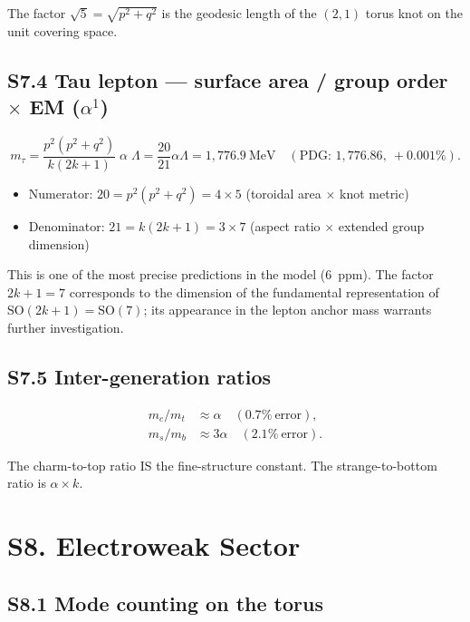 \documentclass[11pt,a4paper]{article}
\begin{document}
The factor $\sqrt{5} = \sqrt{p^2+q^2}$ is the geodesic length of the $(2,1)$ torus knot on the unit covering space.

\subsection{S7.4 Tau lepton --- surface area / group order \texorpdfstring{$\times$}{x} EM \texorpdfstring{($\alpha^1$)}{(alpha1)}}

\begin{equation}
  m_\tau = \frac{p^2(p^2+q^2)}{k(2k+1)}\;\alpha\;\Lambda = \frac{20}{21}\alpha\Lambda = 1{,}776.9~\text{MeV} \quad (\text{PDG: } 1{,}776.86,\ +0.001\%).
\end{equation}

\begin{itemize}
  \item Numerator: $20 = p^2(p^2+q^2) = 4\times 5$ (toroidal area $\times$ knot metric)
  \item Denominator: $21 = k(2k+1) = 3\times 7$ (aspect ratio $\times$ extended group dimension)
\end{itemize}

This is one of the most precise predictions in the model (6~ppm). The factor $2k+1 = 7$ corresponds to the dimension of the fundamental representation of $\mathrm{SO}(2k+1) = \mathrm{SO}(7)$; its appearance in the lepton anchor mass warrants further investigation.

\subsection{S7.5 Inter-generation ratios}

\begin{align}
  m_c/m_t &\approx \alpha \quad (0.7\%\ \text{error}), \\
  m_s/m_b &\approx 3\alpha \quad (2.1\%\ \text{error}).
\end{align}

The charm-to-top ratio IS the fine-structure constant. The strange-to-bottom ratio is $\alpha \times k$.

\section{S8. Electroweak Sector}
\label{sec:S8}

\subsection{S8.1 Mode counting on the torus}
\end{document}
